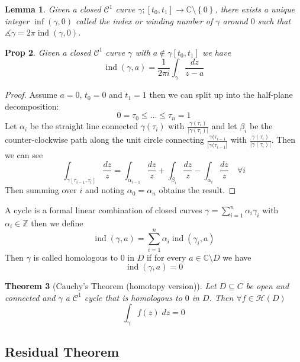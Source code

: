 \documentclass[11pt]{article}
\newcommand{\abs}[1]{\left|#1\right|}
\DeclareMathOperator{\ind}{\text{ind}}
\newcommand{\C}{\mathbb{C}}
\newcommand{\Z}{\mathbb{Z}}
\newenvironment{defin}
	{\begin{mdframed}[backgroundcolor=white, roundcorner=5pt, linewidth=1pt]}
	{\end{mdframed}}
\newcommand{\mdf}[1]{{\color{red} #1}}
\newtheorem{theorem}{Theorem}[section]
\newtheorem{prop}[theorem]{Prop}
\newtheorem{lemma}[theorem]{Lemma}
\begin{document}
\begin{lemma}
Given a closed $\mathcal{C}^1$ curve $\gamma;[t_0, t_1]\to\C\setminus\left\{0\right\}$, there exists a unique integer \mdf{$\inf(\gamma,0)$} called the \mdf{index} or \mdf{winding number} of $\gamma$ around $0$ such that $\measuredangle\gamma=2\pi \ind(\gamma, 0)$.
\end{lemma}

\begin{prop}
Given a closed $\mathcal{C}^1$ curve $\gamma$ with $a\not\in\gamma[t_0, t_1]$ we have
\[
	\ind(\gamma, a)=\frac{1}{2\pi i}\int_\gamma\frac{dz}{z-a}
\]
\end{prop}

\begin{proof}
Assume $a=0$, $t_0=0$ and $t_1=1$ then we can split up into the half-plane decomposition: 
\[
0=\tau_0 \leq \dots \leq \tau_n =1
\]
Let $\alpha_i$ be the straight line connected $\gamma(\tau_i)$ with $\frac{\gamma(\tau_i)}{\abs{\gamma(\tau_i)}}$ and let $\beta_i$ be the counter-clockwise path along the unit circle connecting $\frac{\gamma(\tau_{i-1}}{\abs{\gamma(\tau_{i-1}}}$ with $\frac{\gamma(\tau_i)}{\abs{\gamma(\tau_i)}}$.
Then we can see
\[
	\int_{\gamma[\tau_{i-1}, \tau_i]}\frac{dz}{z}=\int_{\alpha_{i-1}}\frac{dz}{z}+\int_{\beta_i}\frac{dz}{z}-\int_{\alpha_i}\frac{dz}{z}\quad\forall i
\]
Then summing over $i$ and noting $\alpha_0=\alpha_n$ obtains the result.
\end{proof}

\begin{defin}
	A \mdf{cycle} is a formal linear combination of closed curves $\gamma=\sum_{i=1}^{n}\alpha_i\gamma_i$ with $\alpha_i\in\Z$ then we define
	\[
		\ind(\gamma,a)=\sum_{i=1}^{n}\alpha_i\ind(\gamma_i, a)
	\]
	Then $\gamma$ is called \mdf{homologous to $0$ in $D$} if for every $a\in\C\setminus D$ we have
	\[
		\ind(\gamma, a)=0
	\]
\end{defin}

\begin{theorem}[Cauchy's Theorem (homotopy version)]
Let $D\subseteq C$ be open and connected and $\gamma$ a $\mathcal{C}^1$ cycle that is homologous to $0$ in $D$.
Then $\forall f\in\mathcal{H}(D)$
\[
	\int_\gamma f(z)\;dz=0
\]
\end{theorem}

\subsection{Residual Theorem}
\end{document}
